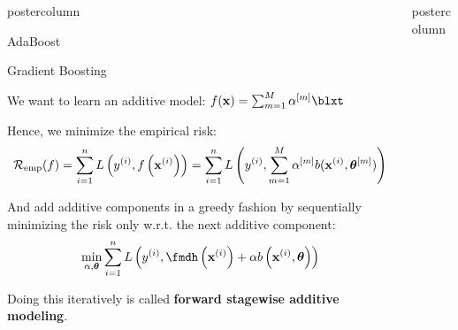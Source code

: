 \documentclass{beamer}
\newlength{\columnheight} %
\begin{document}
\begin{frame}[fragile]{}
\begin{columns}
\begin{column}{.31\textwidth}
\begin{beamercolorbox}[center]{postercolumn}
\begin{minipage}{.98\textwidth}
{\begin{myblock}{AdaBoost}
							
						\end{myblock} 


            \begin{myblock}{Gradient Boosting}

We want to learn an additive model: $
\fx = \sum_{m=1}^M \alpha^{[m]} \blxt$

Hence, we minimize the empirical risk:
$$
\riskef = \sum_{i=1}^n L\left(\yi,\fxi \right) =
\sum_{i=1}^n L\left(\yi, \sum_{m=1}^M \alpha^{[m]} b(\xi, \thetav^{[m]}) %
\right)
$$

And add additive components in a greedy fashion by sequentially minimizing the risk only w.r.t. the next additive component:
$$ \min \limits_{\alpha, \bm{\theta}} \sum_{i=1}^n L\left(\yi, \fmdh\left(\xi\right) + \alpha b\left(\xi, \bm{\theta}\right)\right) $$

Doing this iteratively is called \textbf{forward stagewise additive modeling}.


	\end{myblock} 

				}
			\end{minipage}
		\end{beamercolorbox}
	\end{column}
	

\begin{column}{.31\textwidth}
\begin{beamercolorbox}[center]{postercolumn}
\begin{minipage}{.98\textwidth}
\parbox[t][\columnheight]{\textwidth}{

}
\end{minipage}
\end{beamercolorbox}
\end{column}
\end{columns}
\end{frame}
\end{document}
